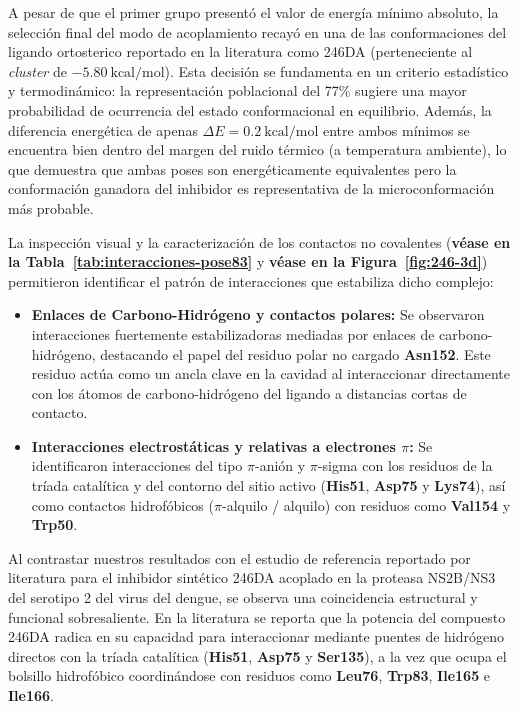 \begin{table}[htbp]
A pesar de que el primer grupo presentó el valor de energía mínimo absoluto, la selección final del modo de acoplamiento recayó en una de las conformaciones del ligando ortosterico reportado en la literatura como 246DA (perteneciente al \textit{cluster} de $-5.80\ \text{kcal/mol}$). Esta decisión se fundamenta en un criterio estadístico y termodinámico: la representación poblacional del 77\% sugiere una mayor probabilidad de ocurrencia del estado conformacional en equilibrio. Además, la diferencia energética de apenas $\Delta E = 0.2\ \text{kcal/mol}$ entre ambos mínimos se encuentra bien dentro del margen del ruido térmico (a temperatura ambiente), lo que demuestra que ambas poses son energéticamente equivalentes pero la conformación ganadora del inhibidor  es representativa de la microconformación más probable.

La inspección visual y la caracterización de los contactos no covalentes  (\textbf{véase en la Tabla~\ref{tab:interacciones-pose83}} y \textbf{véase en la Figura~\ref{fig:246-3d}}) permitieron identificar el patrón de interacciones que estabiliza dicho complejo:

\begin{itemize}
    \item \textbf{Enlaces de Carbono-Hidrógeno y contactos polares:} Se observaron interacciones fuertemente estabilizadoras mediadas por enlaces de carbono-hidrógeno, destacando el papel del residuo polar no cargado \textbf{Asn152}. Este residuo actúa como un ancla clave en la cavidad al interaccionar directamente con los átomos de carbono-hidrógeno del ligando a distancias cortas de contacto.
    \item \textbf{Interacciones electrostáticas y relativas a electrones $\pi$:} Se identificaron interacciones del tipo $\pi$-anión y $\pi$-sigma con los residuos de la tríada catalítica y del contorno del sitio activo (\textbf{His51}, \textbf{Asp75} y \textbf{Lys74}), así como contactos hidrofóbicos ($\pi$-alquilo / alquilo) con residuos como \textbf{Val154} y \textbf{Trp50}.
\end{itemize}

Al contrastar nuestros resultados con el estudio de referencia reportado por literatura para el inhibidor sintético 246DA  acoplado en la proteasa NS2B/NS3 del serotipo 2 del virus del dengue, se observa una coincidencia estructural y funcional sobresaliente. En la literatura se reporta que la potencia del compuesto 246DA radica en su capacidad para interaccionar mediante puentes de hidrógeno directos con la tríada catalítica (\textbf{His51}, \textbf{Asp75} y \textbf{Ser135}), a la vez que ocupa el bolsillo hidrofóbico coordinándose con residuos como \textbf{Leu76}, \textbf{Trp83}, \textbf{Ile165} e \textbf{Ile166}. 


\end{table}
